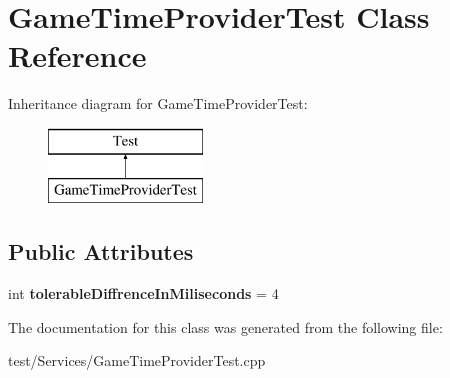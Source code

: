 \hypertarget{classGameTimeProviderTest}{}\section{Game\+Time\+Provider\+Test Class Reference}
\label{classGameTimeProviderTest}
Inheritance diagram for Game\+Time\+Provider\+Test\+:\begin{figure}[H]
\begin{center}
\leavevmode
\includegraphics[height=2.000000cm]{classGameTimeProviderTest}
\end{center}
\end{figure}
\subsection*{Public Attributes}
\begin{DoxyCompactItemize}
\item 
int {\bfseries tolerable\+Diffrence\+In\+Miliseconds} = 4\hypertarget{classGameTimeProviderTest_a026ae8389cb9e4567c20c0ef975ca824}{}\label{classGameTimeProviderTest_a026ae8389cb9e4567c20c0ef975ca824}

\end{DoxyCompactItemize}


The documentation for this class was generated from the following file\+:\begin{DoxyCompactItemize}
\item 
test/\+Services/Game\+Time\+Provider\+Test.\+cpp\end{DoxyCompactItemize}
